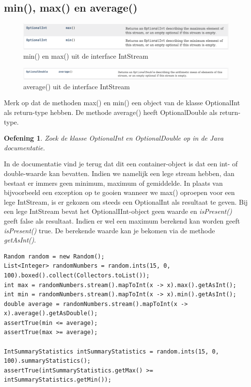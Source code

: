 \documentclass{tstextbook}
\newtheorem{envoefening}{Oefening}[chapter]
\newenvironment{oefening}
               {\begin{boxexercise}\begin{envoefening}}
               {\end{envoefening}\end{boxexercise}}
\begin{document}
\subsection{min(), max() en average()}

\begin{figure}[H]
\includegraphics[width=\linewidth]{images/h6/intstream_max_min.png}
\caption{min() en max() uit de interface IntStream}
\label{fig:instream_min_max}
\end{figure}

\begin{figure}[H]
\includegraphics[width=\linewidth]{images/h6/intstream_average.png}
\caption{average() uit de interface IntStream}
\label{fig:instream_average}
\end{figure}

Merk op dat de methoden max() en min() een object van de klasse OptionalInt als return-type hebben. De methode average() heeft OptionalDouble als return-type. 

\begin{oefening}
Zoek de klasse OptionalInt en OptionalDouble op in de Java documentatie.
\end{oefening}

In de documentatie vind je terug dat dit een container-object is dat een int- of double-waarde kan bevatten. Indien we namelijk een lege stream hebben, dan bestaat er immers geen minimum, maximum of gemiddelde. In plaats van bijvoorbeeld een exception op te gooien wanneer we max() oproepen voor een lege IntStream, is er gekozen om steeds een OptionalInt als resultaat te geven. Bij een lege IntStream bevat het OptionalIInt-object geen waarde en \textit{isPresent()} geeft false als resultaat. Indien er wel een maximum berekend kan worden geeft \textit{isPresent()} true. De berekende waarde kan je bekomen via de methode \textit{getAsInt()}.

\begin{lstlisting}
Random random = new Random();
List<Integer> randomNumbers = random.ints(15, 0, 100).boxed().collect(Collectors.toList());
int max = randomNumbers.stream().mapToInt(x -> x).max().getAsInt();
int min = randomNumbers.stream().mapToInt(x -> x).min().getAsInt();
double average = randomNumbers.stream().mapToInt(x -> x).average().getAsDouble();
assertTrue(min <= average);
assertTrue(max >= average);

IntSummaryStatistics intSummaryStatistics = random.ints(15, 0, 100).summaryStatistics();
assertTrue(intSummaryStatistics.getMax() >= intSummaryStatistics.getMin());
\end{lstlisting}
\end{document}
